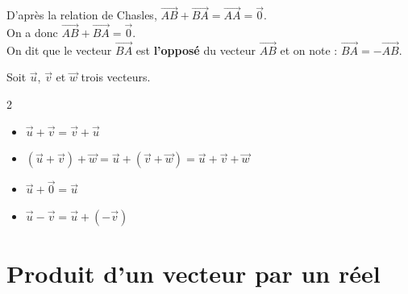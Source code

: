 \begin{minipage}[c]{0.7\linewidth}
D'après la relation de Chasles, $\overrightarrow{AB}+\overrightarrow{BA}=\overrightarrow{AA}=\overrightarrow{0}$. \\On a donc $\overrightarrow{AB}+\overrightarrow{BA}=\overrightarrow{0}$. \\On dit que le vecteur $\overrightarrow{BA}$ est {\bf{l'opposé}} du vecteur $\overrightarrow{AB}$ et on note : $\overrightarrow{BA}=-\overrightarrow{AB}$.
\end{minipage} \hfill
\begin{minipage}[c]{0.25\linewidth}
\end{minipage}

\begin{Propriété}
Soit $\overrightarrow{u}$, $\overrightarrow{v}$ et $\overrightarrow{w}$ trois vecteurs.
\vspace{-0.5cm}
\begin{multicols}{2}
\begin{itemize}[label=\textcolor{Couleur2}{$\bullet$}]
\item $\overrightarrow{u}+\overrightarrow{v}=\overrightarrow{v}+\overrightarrow{u}$
\item $(\overrightarrow{u}+\overrightarrow{v})+\overrightarrow{w}=\overrightarrow{u}+(\overrightarrow{v}+\overrightarrow{w})=\overrightarrow{u}+\overrightarrow{v}+\overrightarrow{w}$
\item $\overrightarrow{u}+\overrightarrow{0}=\overrightarrow{u}$
\item $\overrightarrow{u}-\overrightarrow{v}=\overrightarrow{u}+(-\overrightarrow{v})$
\end{itemize}
\end{multicols}
\end{Propriété}



\section{Produit d'un vecteur par un réel}

